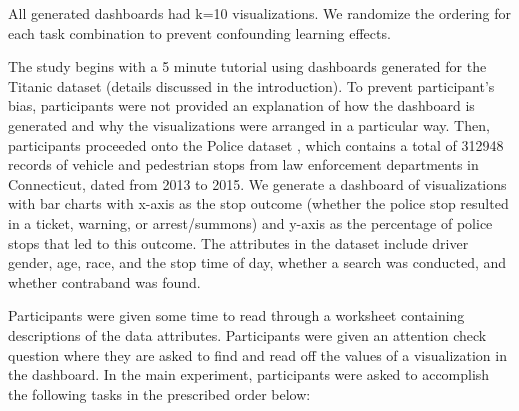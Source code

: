 \begin{enumerate}
\end{enumerate}
All generated dashboards had k=10 visualizations. We randomize the ordering for each task combination to prevent confounding learning effects. 
\par The study begins with a 5 minute tutorial using dashboards generated for the Titanic dataset (details discussed in the introduction). To prevent participant's bias, participants were not provided an explanation of how the dashboard is generated and why the visualizations were arranged in a particular way. Then, participants proceeded onto the Police dataset\cite{police} %
, which contains a total of 312948 records of vehicle and pedestrian stops from law enforcement departments in Connecticut, dated from 2013 to 2015. We generate a dashboard of visualizations with bar charts with x-axis as the stop outcome (whether the police stop resulted in a ticket, warning, or arrest/summons) and y-axis as the percentage of police stops that led to this outcome. The attributes in the dataset include driver gender, age, race, and the stop time of day, whether a search was conducted, and whether contraband was found.
\par Participants were given some time to read through a worksheet containing descriptions of the data attributes. Participants were given an attention check question where they are asked to find and read off the values of a visualization in the dashboard. In the main experiment, participants were asked to accomplish the following tasks in the prescribed order below:

